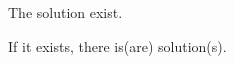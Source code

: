 \documentclass{ximera}
\begin{document}
\begin{exercise}
\begin{enumerate}
The solution  exist.

    \begin{problem}
    
        If it exists, there is(are)  solution(s).

    \end{problem}


\end{enumerate}

\end{exercise}
\end{document}
